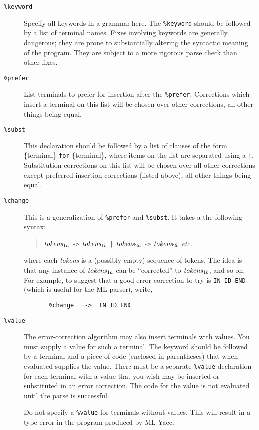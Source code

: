 \documentclass{article}
\begin{document}
\begin{description}
\item[{\tt \%keyword}]
    Specify all keywords in a grammar here.  The {\tt \%keyword}
    should be followed by a list
    of terminal names.   Fixes involving keywords are generally dangerous;
    they are prone to substantially altering the syntactic meaning
    of the program.  They are subject to a more rigorous parse check than
    other fixes.

\item[{\tt \%prefer}]
     List terminals to prefer for insertion after the {\tt \%prefer}.
Corrections which insert a terminal on this list will be chosen over
other corrections, all other things being equal.
\item[{\tt \%subst}]
        This declaration should be followed by a list of clauses of the
     form \{terminal\} {\tt for} \{terminal\}, where items on the list are
     separated using a {\tt |}.  Substitution corrections on this list
will be chosen over all other corrections except preferred insertion
corrections (listed above), all other things being equal.
\item[{\tt \%change}]
    This is a generalization of {\tt \%prefer}  and {\tt \%subst}.
It takes a the following syntax:
\begin{quote}
${\it tokens}_{1a}$ \verb|->| ${\it tokens}_{1b}$ \verb+|+ ${\it tokens}_{2a}$ \verb|->| ${\it tokens}_{2b}$ {\it etc.}
\end{quote}
where each {\it tokens} is a (possibly empty) sequence of tokens.  The
idea is that any instance of ${\it tokens}_{1a}$ can be ``corrected'' to
${\it tokens}_{1b}$, and so on.  For example, to suggest that a good
error correction to try is \verb|IN ID END| (which is useful for the
ML parser), write,
\begin{verbatim}
       %change   ->  IN ID END
\end{verbatim}
\item[{\tt \%value}]
        The error-correction algorithm may also insert terminals with values.
     You must supply a value for such a terminal. The keyword
     should be followed by a terminal and a piece of
     code (enclosed in parentheses) that when evaluated supplies the value. 
     There must be a separate {\tt \%value} declaration for each terminal with
     a value that you wish may be inserted or substituted in an error correction.
     The code for the value is not evaluated until the parse is
     successful.

         Do not specify a {\tt \%value} for terminals without
     values. This will result in a type error in the program produced by
     ML-Yacc.
\end{description}
\end{document}
